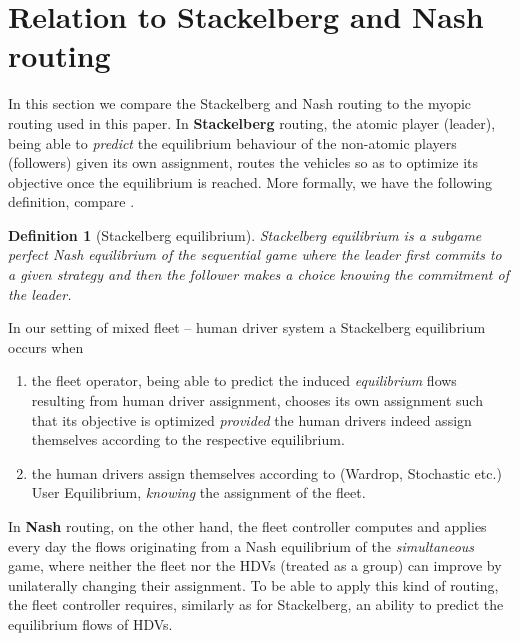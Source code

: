 \documentclass[a4paper,11pt]{article}
\newtheorem{definition}[theorem]{Definition}
\begin{document}
\appendix

\section{Relation to Stackelberg and Nash routing} 
\label{Sec_Stackelberg}
In this section we compare the Stackelberg and Nash routing to the myopic routing used in this paper. In {\bf Stackelberg} routing, the atomic player (leader), being able to \emph{predict} the equilibrium behaviour of the non-atomic players (followers) given its own assignment, routes the vehicles so as to optimize its objective once the equilibrium is reached. More formally, we have the following definition, compare \cite{StackelbergRoughgarden, CorreaStackelberg}. 

\begin{definition}[Stackelberg equilibrium]
Stackelberg equilibrium \cite{Stackelberg} is a subgame perfect Nash equilibrium of the sequential game where the leader first commits to a given strategy and then the follower makes a choice \emph{knowing} the commitment of the leader.
\end{definition}

\noindent In our setting of mixed fleet -- human driver system a Stackelberg equilibrium occurs when 
\begin{enumerate}
\item[i)] the fleet operator, being able to predict the induced \emph{equilibrium} flows resulting from human driver assignment, chooses its own assignment such that its objective is optimized \emph{provided} the human drivers indeed assign themselves according to the respective equilibrium. 
\item[ii)] the human drivers assign themselves according to (Wardrop, Stochastic etc.) User Equilibrium, \emph{knowing} the assignment of the fleet.
\end{enumerate}
\noindent In {\bf Nash} routing, on the other hand, the fleet controller computes and applies every day the flows originating from a Nash equilibrium of the \emph{simultaneous} game, where neither the fleet nor the HDVs (treated as a group) can improve by unilaterally changing their assignment. To be able to apply this kind of routing, the fleet controller requires, similarly as for Stackelberg, an ability to predict the equilibrium flows of HDVs. 
\end{document}
